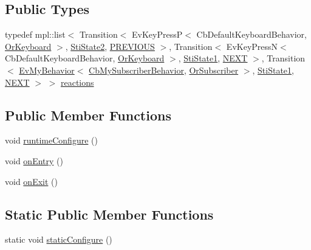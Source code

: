 \subsection*{Public Types}
\begin{DoxyCompactItemize}
\item 
typedef mpl\+::list$<$ Transition$<$ Ev\+Key\+PressP$<$ Cb\+Default\+Keyboard\+Behavior, \hyperlink{classsm__ferrari_1_1OrKeyboard}{Or\+Keyboard} $>$, \hyperlink{structsm__ferrari_1_1inner__states_1_1StiState2}{Sti\+State2}, \hyperlink{structsm__ferrari_1_1inner__states_1_1StiState3_1_1PREVIOUS}{P\+R\+E\+V\+I\+O\+US} $>$, Transition$<$ Ev\+Key\+PressN$<$ Cb\+Default\+Keyboard\+Behavior, \hyperlink{classsm__ferrari_1_1OrKeyboard}{Or\+Keyboard} $>$, \hyperlink{structsm__ferrari_1_1inner__states_1_1StiState1}{Sti\+State1}, \hyperlink{structsm__ferrari_1_1inner__states_1_1StiState3_1_1NEXT}{N\+E\+XT} $>$, Transition$<$ \hyperlink{structsm__ferrari_1_1cl__subscriber_1_1EvMyBehavior}{Ev\+My\+Behavior}$<$ \hyperlink{classsm__ferrari_1_1cl__subscriber_1_1CbMySubscriberBehavior}{Cb\+My\+Subscriber\+Behavior}, \hyperlink{classsm__ferrari_1_1OrSubscriber}{Or\+Subscriber} $>$, \hyperlink{structsm__ferrari_1_1inner__states_1_1StiState1}{Sti\+State1}, \hyperlink{structsm__ferrari_1_1inner__states_1_1StiState3_1_1NEXT}{N\+E\+XT} $>$ $>$ \hyperlink{structsm__ferrari_1_1inner__states_1_1StiState3_a7630ec646fb707c9df7922f94d4ad768}{reactions}
\end{DoxyCompactItemize}
\subsection*{Public Member Functions}
\begin{DoxyCompactItemize}
\item 
void \hyperlink{structsm__ferrari_1_1inner__states_1_1StiState3_a1f63c011c0946341d4b0d8dd9c969a1e}{runtime\+Configure} ()
\item 
void \hyperlink{structsm__ferrari_1_1inner__states_1_1StiState3_a44e7047d2e734c328b28b4a9ce668d44}{on\+Entry} ()
\item 
void \hyperlink{structsm__ferrari_1_1inner__states_1_1StiState3_a9f4830bb4bf3b5cf257f92a926869cb6}{on\+Exit} ()
\end{DoxyCompactItemize}
\subsection*{Static Public Member Functions}
\begin{DoxyCompactItemize}
\item 
static void \hyperlink{structsm__ferrari_1_1inner__states_1_1StiState3_a7c4d0a2a44d3460a1fe66defbd1c4770}{static\+Configure} ()
\end{DoxyCompactItemize}
